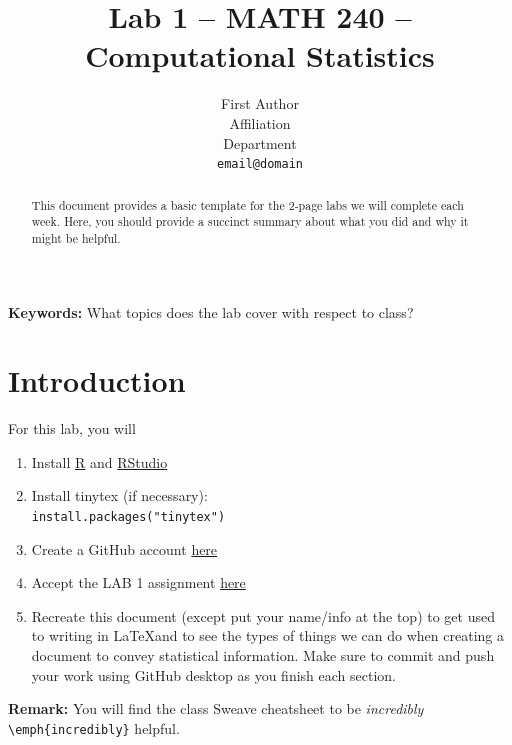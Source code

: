 \documentclass{article}\usepackage[]{graphicx}\usepackage[]{xcolor}
\begin{document}
\vspace{-1in}
\title{Lab 1 – MATH 240 – Computational Statistics}

\author{
  First Author \\
  Affiliation  \\
  Department  \\
  {\tt email@domain}
}

\date{}

\maketitle

\begin{multicols}{2}
\begin{abstract}
This document provides a basic template for the
2-page labs we will complete each week. Here, you
should provide a succinct summary about what you
did and why it might be helpful.
\end{abstract}

\noindent \textbf{Keywords:} What topics does the lab cover with respect
to class?

\section{Introduction}
For this lab, you will
\begin{enumerate}
  \item Install \href{https://cran.rstudio.com/}{R} and \href{https://posit.co/download/rstudio-desktop/}{RStudio}
  \item Install tinytex (if necessary): \\ \texttt{install.packages("tinytex")}
  \item Create a GitHub account \href{https://github.com/}{here}
  \item Accept the LAB 1 assignment \href{https://classroom.github.com/assignment-invitations/49ec7c38806e92bfef8bf3094b9b11d3}{here}
  \item Recreate this document (except put your name/info at
the top) to get used to writing in \LaTeX  and to see the
types of things we can do when creating a document
to convey statistical information. Make sure to commit
and push your work using GitHub desktop as you finish
each section.
\end{enumerate}


\textbf{Remark:} You will find the class Sweave cheatsheet to be
\emph{incredibly} \verb|\emph{incredibly}| helpful. 



\end{multicols}
\end{document}
